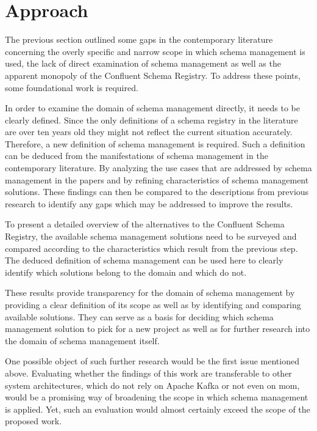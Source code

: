 
\section{Approach}\label{sec:approach}

The previous section outlined some gaps in the contemporary literature concerning the overly specific and narrow scope in which schema management is used, the lack of direct examination of schema management as well as the apparent monopoly of the Confluent Schema Registry.
To address these points, some foundational work is required.

In order to examine the domain of schema management directly, it needs to be clearly defined.
Since the only definitions of a schema registry in the literature are over ten years old \parencites(see)(){heery_metadata_2003}{ma_iip_2010}{kreps_kafka_2011} they might not reflect the current situation accurately.
Therefore, a new definition of schema management is required.
Such a definition can be deduced from the manifestations of schema management in the contemporary literature.
By analyzing the use cases that are addressed by schema management in the papers and by refining characteristics of schema management solutions.
These findings can then be compared to the descriptions from previous research to identify any gaps which may be addressed to improve the results.

To present a detailed overview of the alternatives to the Confluent Schema Registry, the available schema management solutions need to be surveyed and compared according to the characteristics which result from the previous step.
The deduced definition of schema management can be used here to clearly identify which solutions belong to the domain and which do not.

These results provide transparency for the domain of schema management by providing a clear definition of its scope as well as by identifying and comparing available solutions.
They can serve as a basis for deciding which schema management solution to pick for a new project as well as for further research into the domain of schema management itself.

One possible object of such further research would be the first issue mentioned above.
Evaluating whether the findings of this work are transferable to other system architectures, which do not rely on Apache Kafka or not even on \gls{mom}, would be a promising way of broadening the scope in which schema management is applied.
Yet, such an evaluation would almost certainly exceed the scope of the proposed work.
